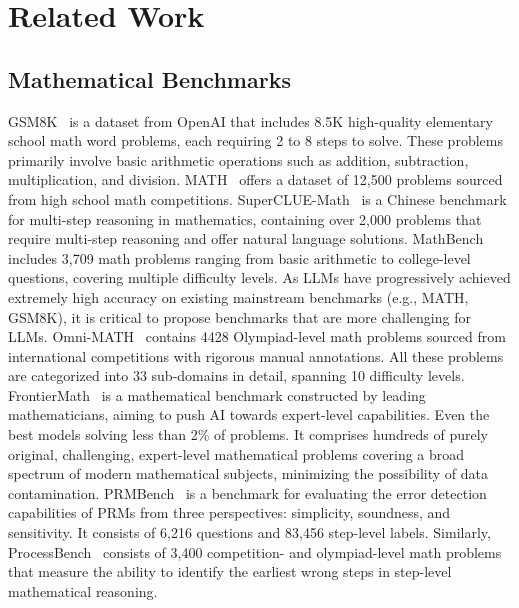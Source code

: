 \section{Related Work}
\subsection{Mathematical Benchmarks}
GSM8K~\cite{cobbe2021training} is a dataset from OpenAI that includes 8.5K high-quality elementary school math word problems, each requiring 2 to 8 steps to solve. These problems primarily involve basic arithmetic operations such as addition, subtraction, multiplication, and division. MATH~\cite{hendrycks2021measuring} offers a dataset of 12,500 problems sourced from high school math competitions. SuperCLUE-Math~\cite{xu2024superclue} is a Chinese benchmark for multi-step reasoning in mathematics, containing over 2,000 problems that require multi-step reasoning and offer natural language solutions. MathBench~\cite{liu2024mathbench} includes 3,709 math problems ranging from basic arithmetic to college-level questions, covering multiple difficulty levels. As LLMs have progressively achieved extremely high accuracy on existing mainstream benchmarks (e.g., MATH, GSM8K), it is critical to propose benchmarks that are more challenging for LLMs. Omni-MATH~\cite{gao2024omni} contains 4428 Olympiad-level math problems sourced from international competitions with rigorous manual annotations. All these problems are categorized into 33 sub-domains in detail, spanning 10 difficulty levels. FrontierMath~\cite{glazer2024frontiermath} is a mathematical benchmark constructed by leading mathematicians, aiming to push AI towards expert-level capabilities. Even the best models solving less than 2\% of problems. It comprises hundreds of purely original, challenging, expert-level mathematical problems covering a broad spectrum of modern mathematical subjects, minimizing the possibility of data contamination. PRMBench~\cite{song2025prmbench} is a benchmark for evaluating the error detection capabilities of PRMs from three perspectives: simplicity, soundness, and sensitivity. It consists of 6,216 questions and 83,456 step-level labels. Similarly, ProcessBench~\cite{zheng2024processbench} consists of 3,400 competition- and olympiad-level math problems that measure the ability to identify the earliest wrong steps in step-level mathematical reasoning. 
